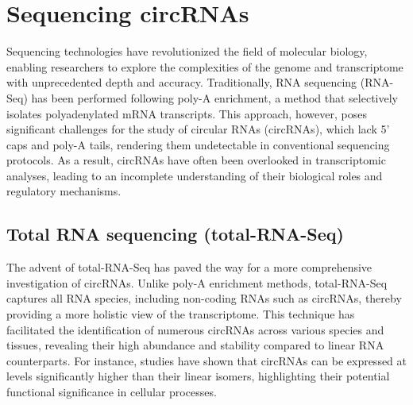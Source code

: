 \section{Sequencing circRNAs}

Sequencing technologies have revolutionized the field of molecular biology,
enabling researchers to explore the complexities of the genome and transcriptome
with unprecedented depth and accuracy. Traditionally, RNA sequencing (RNA-Seq)
has been performed following poly-A enrichment, a method that selectively
isolates polyadenylated mRNA transcripts. This approach, however, poses
significant challenges for the study of circular RNAs (circRNAs), which lack 5'
caps and poly-A tails, rendering them undetectable in conventional sequencing
protocols\supercite{guo_expanded_2014}. As a result, circRNAs have often been overlooked in
transcriptomic analyses, leading to an incomplete understanding of their
biological roles and regulatory mechanisms.

\subsection{Total RNA sequencing (total-RNA-Seq)}
The advent of total-RNA-Seq has paved the way for a more
comprehensive investigation of circRNAs. Unlike poly-A enrichment methods,
total-RNA-Seq captures all RNA species, including non-coding RNAs such as
circRNAs, thereby providing a more holistic view of the
transcriptome\supercite{panda_identification_2017}. This technique has
facilitated the identification of numerous
circRNAs across various species and tissues, revealing their high abundance and
stability compared to linear RNA
counterparts\supercite{liu_circular_2016,cao_expression_2018}. For instance,
studies have shown that circRNAs can be expressed at levels
significantly higher than their linear isomers, highlighting their potential
functional significance in cellular processes\supercite{liu_circular_2016}.
